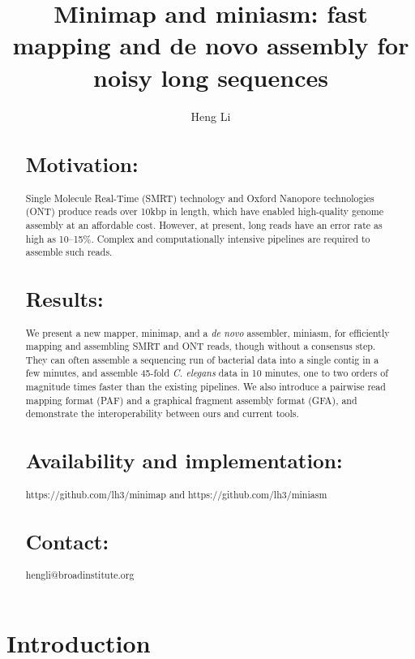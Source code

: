 \documentclass{bioinfo}
\begin{document}

\title[Long-read mapping and assembly]{Minimap and miniasm: fast mapping and de novo assembly for noisy long sequences}
\author[Li]{Heng Li}
\address{Broad Institute, 75 Ames Street, Cambridge, MA 02142, USA}
\maketitle

\begin{abstract}

\section{Motivation:} Single Molecule Real-Time (SMRT) technology and Oxford
Nanopore technologies (ONT) produce reads over 10kbp in length, which have
enabled high-quality genome assembly at an affordable cost.  However, at
present, long reads have an error rate as high as 10--15\%.  Complex and
computationally intensive pipelines are required to assemble such reads.

\section{Results:} We present a new mapper, minimap, and a \emph{de novo}
assembler, miniasm, for efficiently mapping and assembling SMRT and ONT reads,
though without a consensus step. They can often assemble a sequencing run of
bacterial data into a single contig in a few minutes, and assemble 45-fold
\emph{C. elegans} data in 10 minutes, one to two orders of magnitude times
faster than the existing pipelines. We also introduce a pairwise read mapping
format (PAF) and a graphical fragment assembly format (GFA), and demonstrate
the interoperability between ours and current tools.

\section{Availability and implementation:} https://github.com/lh3/minimap and
https://github.com/lh3/miniasm

\section{Contact:} hengli@broadinstitute.org

\end{abstract}

\section{Introduction}
\end{document}

